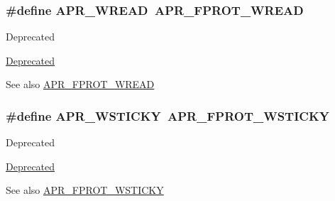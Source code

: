 \subsubsection[{\texorpdfstring{A\+P\+R\+\_\+\+W\+R\+E\+AD}{APR_WREAD}}]{\setlength{\rightskip}{0pt plus 5cm}\#define A\+P\+R\+\_\+\+W\+R\+E\+AD~{\bf A\+P\+R\+\_\+\+F\+P\+R\+O\+T\+\_\+\+W\+R\+E\+AD}}\hypertarget{group__apr__file__permissions_ga5c987d2b1ace95b4ffa7c5a322721aad}{}\label{group__apr__file__permissions_ga5c987d2b1ace95b4ffa7c5a322721aad}
\begin{DoxyRefDesc}{Deprecated}
\item[\hyperlink{deprecated__deprecated000012}{Deprecated}]\end{DoxyRefDesc}
\begin{DoxySeeAlso}{See also}
\hyperlink{group__apr__file__permissions_ga194718630250b0f0dd4be38c86dac717}{A\+P\+R\+\_\+\+F\+P\+R\+O\+T\+\_\+\+W\+R\+E\+AD} 
\end{DoxySeeAlso}
\subsubsection[{\texorpdfstring{A\+P\+R\+\_\+\+W\+S\+T\+I\+C\+KY}{APR_WSTICKY}}]{\setlength{\rightskip}{0pt plus 5cm}\#define A\+P\+R\+\_\+\+W\+S\+T\+I\+C\+KY~{\bf A\+P\+R\+\_\+\+F\+P\+R\+O\+T\+\_\+\+W\+S\+T\+I\+C\+KY}}\hypertarget{group__apr__file__permissions_ga824d6685d59e3efddb6ee7fdbee69c13}{}\label{group__apr__file__permissions_ga824d6685d59e3efddb6ee7fdbee69c13}
\begin{DoxyRefDesc}{Deprecated}
\item[\hyperlink{deprecated__deprecated000011}{Deprecated}]\end{DoxyRefDesc}
\begin{DoxySeeAlso}{See also}
\hyperlink{group__apr__file__permissions_ga989dbea02f779a5f20a643d7e4ee9952}{A\+P\+R\+\_\+\+F\+P\+R\+O\+T\+\_\+\+W\+S\+T\+I\+C\+KY} 
\end{DoxySeeAlso}

